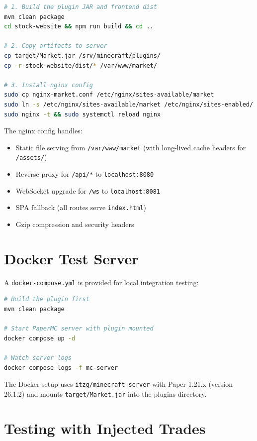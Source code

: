\documentclass[12pt,a4paper]{report}
\begin{document}
\begin{lstlisting}[language=sh, caption=Deploy with nginx]
# 1. Build the plugin JAR and frontend dist
mvn clean package
cd stock-website && npm run build && cd ..

# 2. Copy artifacts to server
cp target/Market.jar /srv/minecraft/plugins/
cp -r stock-website/dist/* /var/www/market/

# 3. Install nginx config
sudo cp nginx-market.conf /etc/nginx/sites-available/market
sudo ln -s /etc/nginx/sites-available/market /etc/nginx/sites-enabled/
sudo nginx -t && sudo systemctl reload nginx
\end{lstlisting}

The nginx config handles:
\begin{itemize}
\item Static file serving from \texttt{/var/www/market} (with long-lived cache
  headers for \texttt{/assets/})
\item Reverse proxy for \texttt{/api/*} to \texttt{localhost:8080}
\item WebSocket upgrade for \texttt{/ws} to \texttt{localhost:8081}
\item SPA fallback (all routes serve \texttt{index.html})
\item Gzip compression and security headers
\end{itemize}

\section{Docker Test Server}

A \texttt{docker-compose.yml} is provided for local integration testing:

\begin{lstlisting}[language=sh, caption=Start Docker test server]
# Build the plugin first
mvn clean package

# Start PaperMC server with plugin mounted
docker compose up -d

# Watch server logs
docker compose logs -f mc-server
\end{lstlisting}

The Docker setup uses \texttt{itzg/minecraft-server} with Paper 1.21.x
(version 26.1.2) and mounts \texttt{target/Market.jar} into the plugins
directory.

\section{Testing with Injected Trades}
\end{document}
